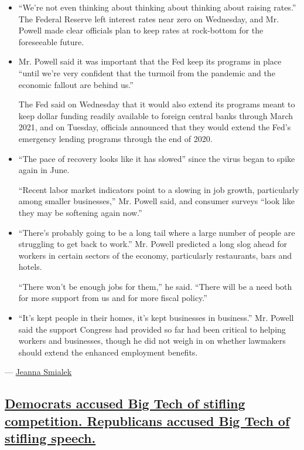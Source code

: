 \begin{itemize}
\item
  ``We're not even thinking about thinking about thinking about raising
  rates.'' The Federal Reserve left interest rates near zero on
  Wednesday, and Mr. Powell made clear officials plan to keep rates at
  rock-bottom for the foreseeable future.
\item
  Mr. Powell said it was important that the Fed keep its programs in
  place ``until we're very confident that the turmoil from the pandemic
  and the economic fallout are behind us.''

  The Fed said on Wednesday that it would also extend its programs meant
  to keep dollar funding readily available to foreign central banks
  through March 2021, and on Tuesday, officials announced that they
  would extend the Fed's emergency lending programs through the end of
  2020.
\item
  ``The pace of recovery looks like it has slowed'' since the virus
  began to spike again in June.

  ``Recent labor market indicators point to a slowing in job growth,
  particularly among smaller businesses,'' Mr. Powell said, and consumer
  surveys ``look like they may be softening again now.''
\item
  ``There's probably going to be a long tail where a large number of
  people are struggling to get back to work.'' Mr. Powell predicted a
  long slog ahead for workers in certain sectors of the economy,
  particularly restaurants, bars and hotels.

  ``There won't be enough jobs for them,'' he said. ``There will be a
  need both for more support from us and for more fiscal policy.''
\item
  ``It's kept people in their homes, it's kept businesses in business.''
  Mr. Powell said the support Congress had provided so far had been
  critical to helping workers and businesses, though he did not weigh in
  on whether lawmakers should extend the enhanced employment benefits.
\end{itemize}

--- \href{https://www.nytimes.com/by/jeanna-smialek}{Jeanna Smialek}

\hypertarget{democrats-accused-big-tech-of-stifling-competition-republicans-accused-big-tech-of-stifling-speech}{%
\subsection{\texorpdfstring{\protect\hyperlink{democrats-accused-big-tech-of-stifling-competition-republicans-accused-big-tech-of-stifling-speech}{Democrats
accused Big Tech of stifling competition. Republicans accused Big Tech
of stifling
speech.}}{Democrats accused Big Tech of stifling competition. Republicans accused Big Tech of stifling speech.}}\label{democrats-accused-big-tech-of-stifling-competition-republicans-accused-big-tech-of-stifling-speech}}

